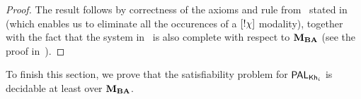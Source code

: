 \begin{proof}
The result follows by correctness of the axioms and rule from~ stated in~ (which enables us to eliminate all the occurences of a $[!\chi]$ modality), together with the fact that the system in~ is also complete with respect to $\mathbf{M}_{\mathbf{BA}}$ (see the proof in~\cite{AFSVQ21,AFSVQ23report}).
\end{proof}



To finish this section, we prove that the satisfiability problem for $\mathsf{PAL}_{{\sf Kh}_i}$ is decidable at least over $\mathbf{M}_{\mathbf{BA}}$.

\medskip 

